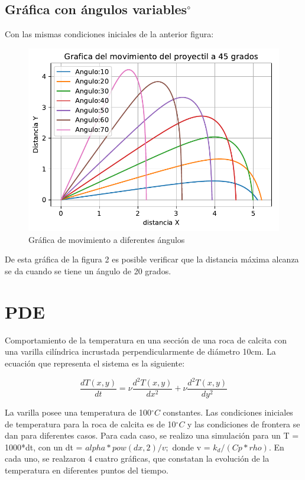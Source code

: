 \documentclass{report}
\begin{document}
\subsection{Gráfica con ángulos variables$^\circ$}
Con las mismas condiciones iniciales de la anterior figura:
\begin{figure}[h]
    \centering
    \includegraphics[scale = 0.5]{ODE_varicion_grados.pdf}
    \caption{Gráfica de movimiento a diferentes ángulos}
    \label{fig:my_label}
\end{figure}
De esta gráfica de la figura 2 es posible verificar que la distancia máxima alcanza se da cuando se tiene un ángulo de 20 grados.

\section*{PDE}
Comportamiento de la temperatura en una sección de una roca de calcita con una varilla cilíndrica incrustada perpendicularmente de diámetro 10cm. La ecuación que representa el sistema es la siguiente:

\begin{equation}
    \frac{dT(x,y)}{dt}=\nu\frac{d^{2}T(x,y)}{dx^{2}}+\nu\frac{d^{2}T(x,y)}{dy^{2}}
\end{equation}

La varilla posee una temperatura de 100$^{\circ}C$ constantes. Las condiciones iniciales de temperatura para la roca de calcita es de 10$^{\circ}C$ y las condiciones de frontera se dan para diferentes casos. Para cada caso, se realizo una simulación para un T = 1000*dt, con un dt = $ alpha*pow(dx,2)/v;$ donde v = $k_d/(Cp*rho)$. En cada uno, se realzaron 4 cuatro gráficas, que constatan la evolución de la temperatura en diferentes puntos del tiempo.
\end{document}
